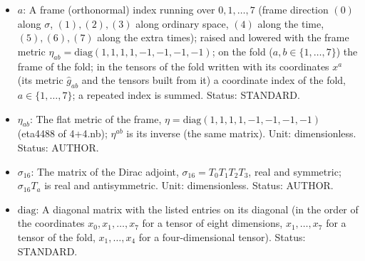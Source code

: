 \documentclass[
  10pt,
]{article}
\begin{document}
\begin{itemize}
  Unit: dimensionless. Status: AUTHOR.
\item
  \(a\): A frame (orthonormal) index running over \(0, 1, \dots, 7\)
  (frame direction \((0)\) along \(\sigma\), \((1), (2), (3)\) along
  ordinary space, \((4)\) along the time, \((5), (6), (7)\) along the
  extra times); raised and lowered with the frame metric
  \(\eta_{ab} = \mathrm{diag}(1, 1, 1, 1, -1, -1, -1, -1)\); on the fold
  (\(a, b \in \{1, \dots, 7\}\)) the frame of the fold; in the tensors
  of the fold written with its coordinates \(x^a\) (its metric
  \(\hat g_{ab}\) and the tensors built from it) a coordinate index of
  the fold, \(a \in \{1, \dots, 7\}\); a repeated index is summed.
  Status: STANDARD.
\item
  \(\eta_{ab}\): The flat metric of the frame,
  \(\eta = \mathrm{diag}(1, 1, 1, 1, -1, -1, -1, -1)\) (eta4488 of
  4+4.nb); \(\eta^{ab}\) is its inverse (the same matrix). Unit:
  dimensionless. Status: AUTHOR.
\item
  \(\sigma_{16}\): The matrix of the Dirac adjoint,
  \(\sigma_{16} = T_0T_1T_2T_3\), real and symmetric; \(\sigma_{16}T_a\)
  is real and antisymmetric. Unit: dimensionless. Status: AUTHOR.
\item
  \(\mathrm{diag}\): A diagonal matrix with the listed entries on its
  diagonal (in the order of the coordinates \(x_0, x_1, \dots, x_7\) for
  a tensor of eight dimensions, \(x_1, \dots, x_7\) for a tensor of the
  fold, \(x_1, \dots, x_4\) for a four-dimensional tensor). Status:
  STANDARD.
\end{itemize}
\end{document}
